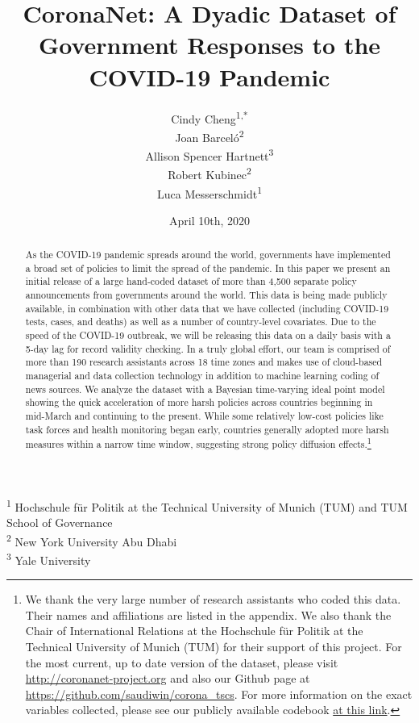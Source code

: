 \documentclass[]{article}
\title{CoronaNet: A Dyadic Dataset of Government Responses to the COVID-19 Pandemic}
\author{Cindy Cheng\textsuperscript{1,*} \\ Joan Barceló\textsuperscript{2} \\ Allison Spencer Hartnett\textsuperscript{3} \\ Robert Kubinec\textsuperscript{2} \\ Luca Messerschmidt\textsuperscript{1}}
\date{April 10th, 2020}
\let\rmarkdownfootnote\footnote%
\def\footnote{\protect\rmarkdownfootnote}
\begin{document}
\maketitle
\begin{abstract}
As the COVID-19 pandemic spreads around the world, governments have implemented a broad set of policies to limit the spread of the pandemic. In this paper we present an initial release of a large hand-coded dataset of more than 4,500 separate policy announcements from governments around the world. This data is being made publicly available, in combination with other data that we have collected (including COVID-19 tests, cases, and deaths) as well as a number of country-level covariates. Due to the speed of the COVID-19 outbreak, we will be releasing this data on a daily basis with a 5-day lag for record validity checking. In a truly global effort, our team is comprised of more than 190 research assistants across 18 time zones and makes use of cloud-based managerial and data collection technology in addition to machine learning coding of news sources. We analyze the dataset with a Bayesian time-varying ideal point model showing the quick acceleration of more harsh policies across countries beginning in mid-March and continuing to the present. While some relatively low-cost policies like task forces and health monitoring began early, countries generally adopted more harsh measures within a narrow time window, suggesting strong policy diffusion effects.\footnote{We thank the very large number of research assistants who coded this data. Their names and affiliations are listed in the appendix. We also thank the Chair of International Relations at the Hochschule für Politik at the Technical University of Munich (TUM) for their support of this project. For the most current, up to date version of the dataset, please visit \url{http://coronanet-project.org} and also our Github page at \url{https://github.com/saudiwin/corona_tscs}. For more information on the exact variables collected, please see our publicly available codebook \href{https://docs.google.com/document/d/1zvNMpwj0onFvUZ_gLl4RRjqS-clbHv3TIX6EOHofsME/edit?usp=sharing}{at this link}.}
\end{abstract}

\textsuperscript{1} Hochschule für Politik at the Technical University of Munich (TUM) and TUM School of Governance\\
\textsuperscript{2} New York University Abu Dhabi\\
\textsuperscript{3} Yale University
\end{document}
